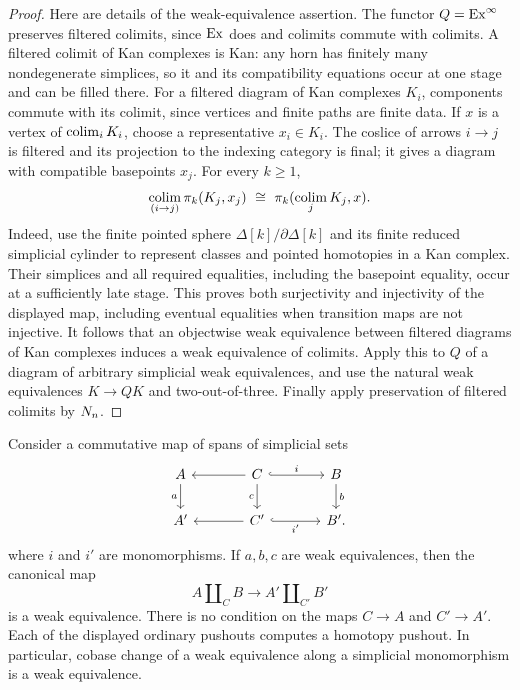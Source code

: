\begin{proof}
Here are details of the weak-equivalence assertion.  The functor
$Q=\mathrm{Ex}^\infty$ preserves filtered colimits, since $\mathrm{Ex}$ does and
colimits commute with colimits.  A filtered colimit of Kan complexes
is Kan: any horn has finitely many nondegenerate simplices, so it
and its compatibility equations occur at one stage and can be filled
there.  For a filtered diagram of Kan complexes $K_i$, components
commute with its colimit, since vertices and finite paths are finite
data.  If $x$ is a vertex of $\operatorname*{colim}_iK_i$, choose a representative
$x_i\in K_i$.  The coslice of arrows $i\to j$ is filtered and its
projection to the indexing category is final; it gives a diagram
with compatible basepoints $x_j$.  For every $k\ge1$,
\[
 \operatorname*{colim}_{(i\to j)}\pi_k(K_j,x_j)
       \ \cong\ \pi_k(\operatorname*{colim}_jK_j,x).
\]
Indeed, use the finite pointed sphere
$\Delta[k]/\partial\Delta[k]$ and its finite reduced simplicial
cylinder to represent classes and pointed homotopies in a Kan
complex.  Their simplices and all required equalities, including
the basepoint equality, occur at a sufficiently late stage.  This
proves both surjectivity and injectivity of the displayed map,
including eventual equalities when transition maps are not
injective.  It follows that an objectwise weak equivalence between
filtered diagrams of Kan complexes induces a weak equivalence of
colimits.  Apply this to $Q$ of a diagram of arbitrary simplicial
weak equivalences, and use the natural weak equivalences $K\to QK$
and two-out-of-three.  Finally apply preservation of filtered
colimits by $N_n$.
\end{proof}

\begin{lemma}
\label{lem:simplicial-gluing}
Consider a commutative map of spans of simplicial sets
\[
 \begin{tikzcd}[column sep=large]
 A \arrow[d,"a"'] &
 C \arrow[l] \arrow[r,hook,"i"] \arrow[d,"c"'] &
 B \arrow[d,"b"]\\
 A' &
 C' \arrow[l] \arrow[r,hook,"i'"'] &
 B'.
 \end{tikzcd}
\]
where $i$ and $i'$ are monomorphisms.
If $a,b,c$ are weak equivalences, then the canonical map
\[
 A\amalg_C B\longrightarrow A'\amalg_{C'}B'
\]
is a weak equivalence.  There is no condition on the maps $C\to A$
and $C'\to A'$.  Each of the displayed ordinary pushouts computes a
homotopy pushout.  In particular, cobase change of a weak equivalence
along a simplicial monomorphism is a weak equivalence.
\end{lemma}

